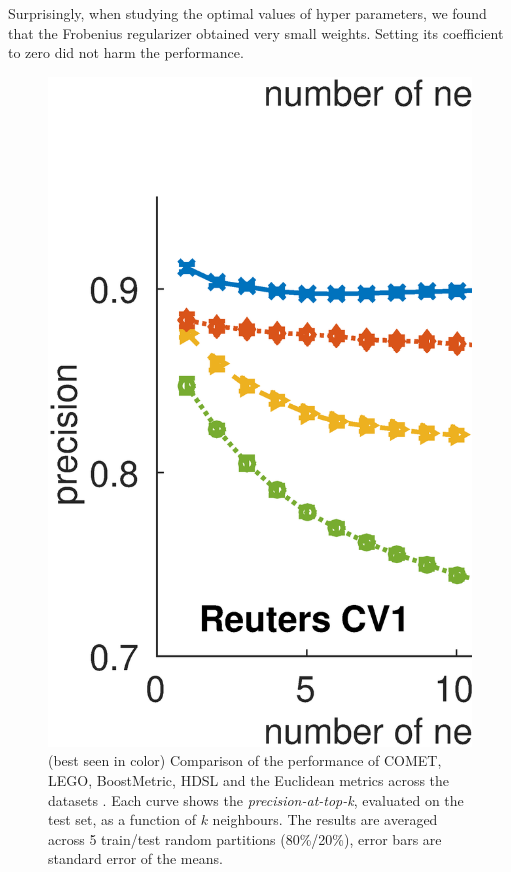 \documentclass{article}
\begin{document}
Surprisingly, when studying the optimal values of hyper parameters, we found that the Frobenius regularizer obtained very small weights. Setting its coefficient to zero did not harm the performance.

\begin{figure}[!h]
\vskip 0.2in
\begin{center}
\centerline{\includegraphics[width=\columnwidth]{Precision_at_K_all_datasets}}
\caption{ (best seen in color) Comparison of the performance of COMET, LEGO, BoostMetric, HDSL and the Euclidean metrics across the datasets . Each curve shows the \textit{precision-at-top-k}, evaluated on the test set, as a function of $k$ neighbours. The results are averaged across 5 train/test random partitions (80\%/20\%), error bars are standard error of the means.}
\label{precFig}
\end{center}
\vskip -0.2in
\end{figure} 
\end{document}
